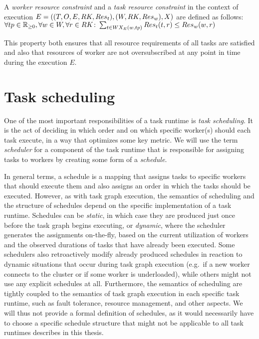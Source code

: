 \vspace{2mm} A \emph{worker resource constraint} and a
\emph{task resource constraint} in the context of execution
$E = ((T, O, E, RK, Res_t), (W, RK, Res_w), X)$
are defined as follows: \vspace{1mm}\\
$\forall tp\in\mathbb{R}_{\geq{}0}, \forall w\in{}W, \forall
r\in{}RK\colon \sum_{t\in{}WX_E(w, tp)} Res_t(t, r) \leq
Res_w(w, r)$

\vspace{1mm}This property both ensures that all resource requirements of all tasks are
satisfied and also that resources of worker are not oversubscribed at any point in time during the
execution $E$.

\section{Task scheduling}
\label{sec:task-scheduling}
One of the most important responsibilities of a task runtime is \emph{task scheduling}. It is the
act of deciding in which order and on which specific worker(s) should each task execute, in a way
that optimizes some key metric. We will use the term \emph{scheduler} for a component of the
task runtime that is responsible for assigning tasks to workers by creating some form of a
\emph{schedule}.

In general terms, a schedule is a mapping that assigns tasks to specific workers that should
execute them and also assigns an order in which the tasks should be executed. However, as with task
graph execution, the semantics of scheduling and the structure of schedules depend on the specific
implementation of a task runtime. Schedules can be \emph{static}, in which case they are
produced just once before the task graph begins executing, or \emph{dynamic}, where the
scheduler generates the assignments on-the-fly, based on the current utilization of workers and the
observed durations of tasks that have already been executed. Some schedulers also retroactively
modify already produced schedules in reaction to dynamic situations that occur during task graph
execution (e.g.\ if a new worker connects to the cluster or if some worker is underloaded), while
others might not use any explicit schedules at all. Furthermore, the semantics of scheduling are
tightly coupled to the semantics of task graph execution in each specific task runtime, such as
fault tolerance, resource management, and other aspects. We will thus not provide a formal
definition of schedules, as it would necessarily have to choose a specific schedule structure that
might not be applicable to all task runtimes describes in this thesis.

